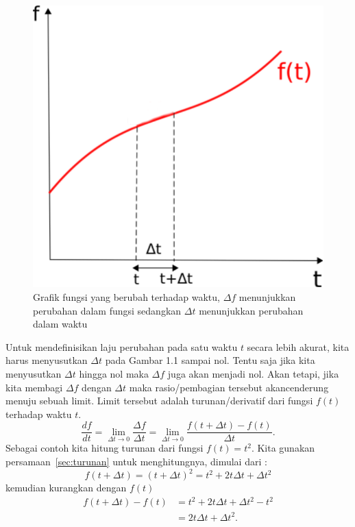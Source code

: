 \begin{figure}[!h]
\centering
\includegraphics[scale=0.6]{pict/differentialgraph.pdf}
\caption{Grafik fungsi yang berubah terhadap waktu, $\Delta f$ menunjukkan perubahan dalam fungsi sedangkan $\Delta t$ menunjukkan perubahan dalam waktu}\label{differential}
\end{figure}
Untuk mendefinisikan laju perubahan pada satu waktu $t$ secara lebih akurat, kita harus menyusutkan $\Delta t$ pada Gambar 1.1 sampai nol. Tentu saja jika kita menyusutkan $\Delta t$ hingga nol maka $\Delta f$ juga akan menjadi nol. Akan tetapi, jika kita membagi $\Delta f$ dengan $\Delta t$ maka rasio/pembagian tersebut akancenderung menuju sebuah limit. Limit tersebut adalah turunan/derivatif dari fungsi $f(t)$ terhadap waktu $t$.
\begin{equation}
\label{sec:turunan}
\frac{df}{dt}=\lim_{\Delta t \rightarrow 0} \frac{\Delta f}{\Delta t}=\lim_{\Delta t \rightarrow 0} \frac{f(t + \Delta t)-f(t)}{\Delta t}.
\end{equation}
Sebagai contoh kita hitung turunan dari fungsi $f(t)=t^2$. Kita gunakan persamaan~\ref{sec:turunan} untuk menghitungnya, dimulai dari :
\[
f(t+\Delta t)=(t+\Delta t)^2=t^2+2t\Delta t + \Delta t^2
\]
kemudian kurangkan dengan $f(t)$
\begin{align*}
f(t+\Delta t)-f(t)&=t^2+2t\Delta t + \Delta t^2 - t^2\\
&=2t\Delta t + \Delta t^2.
\end{align*}
